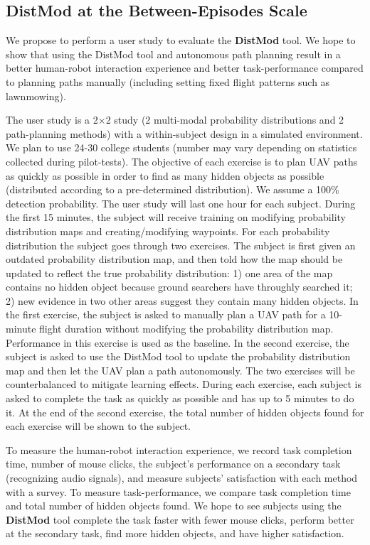 \subsection{\textbf{DistMod} at the Between-Episodes Scale}

We propose to perform a user study to evaluate the \textbf{DistMod} tool. We hope to show that using the DistMod tool and autonomous path planning result in a better human-robot interaction experience and better task-performance compared to planning paths manually (including setting fixed flight patterns such as lawnmowing).

The user study is a 2$\times$2 study (2 multi-modal probability distributions and 2 path-planning methods) with a within-subject design in a simulated environment. We plan to use 24-30 college students (number may vary depending on statistics collected during pilot-tests). The objective of each exercise is to plan UAV paths as quickly as possible in order to find as many hidden objects as possible (distributed according to a pre-determined distribution). We assume a 100\% detection probability. The user study will last one hour for each subject. During the first 15 minutes, the subject will receive training on modifying probability distribution maps and creating/modifying waypoints. For each probability distribution the subject goes through two exercises. The subject is first given an outdated probability distribution map, and then told how the map should be updated to reflect the true probability distribution: 1) one area of the map contains no hidden object because ground searchers have throughly searched it; 2) new evidence in two other areas suggest they contain many hidden objects. In the first exercise, the subject is asked to manually plan a UAV path for a 10-minute flight duration without modifying the probability distribution map. Performance in this exercise is used as the baseline. In the second exercise, the subject is asked to use the DistMod tool to update the probability distribution map and then let the UAV plan a path autonomously. The two exercises will be counterbalanced to mitigate learning effects. During each exercise, each subject is asked to complete the task as quickly as possible and has up to 5 minutes to do it. At the end of the second exercise, the total number of hidden objects found for each exercise will be shown to the subject.

To measure the human-robot interaction experience, we record task completion time, number of mouse clicks, the subject's performance on a secondary task (recognizing audio signals), and measure subjects' satisfaction with each method with a survey. To measure task-performance, we compare task completion time and total number of hidden objects found. We hope to see subjects using the \textbf{DistMod} tool complete the task faster with fewer mouse clicks, perform better at the secondary task, find more hidden objects, and have higher satisfaction.

